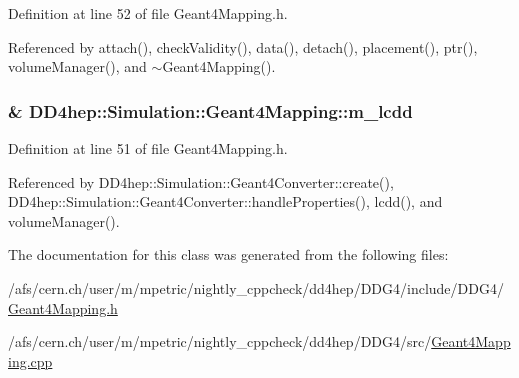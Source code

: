 Definition at line 52 of file Geant4Mapping.h.

Referenced by attach(), checkValidity(), data(), detach(), placement(), ptr(), volumeManager(), and $\sim$Geant4Mapping().\hypertarget{class_d_d4hep_1_1_simulation_1_1_geant4_mapping_a4c514a5fa835d901c01cf5a860960958}{
\subsubsection[{m\_\-lcdd}]{\& {\bf DD4hep::Simulation::Geant4Mapping::m\_\-lcdd}}}
\label{class_d_d4hep_1_1_simulation_1_1_geant4_mapping_a4c514a5fa835d901c01cf5a860960958}


Definition at line 51 of file Geant4Mapping.h.

Referenced by DD4hep::Simulation::Geant4Converter::create(), DD4hep::Simulation::Geant4Converter::handleProperties(), lcdd(), and volumeManager().

The documentation for this class was generated from the following files:\begin{DoxyCompactItemize}
\item 
/afs/cern.ch/user/m/mpetric/nightly\_\-cppcheck/dd4hep/DDG4/include/DDG4/\hyperlink{_geant4_mapping_8h}{Geant4Mapping.h}\item 
/afs/cern.ch/user/m/mpetric/nightly\_\-cppcheck/dd4hep/DDG4/src/\hyperlink{_geant4_mapping_8cpp}{Geant4Mapping.cpp}\end{DoxyCompactItemize}

